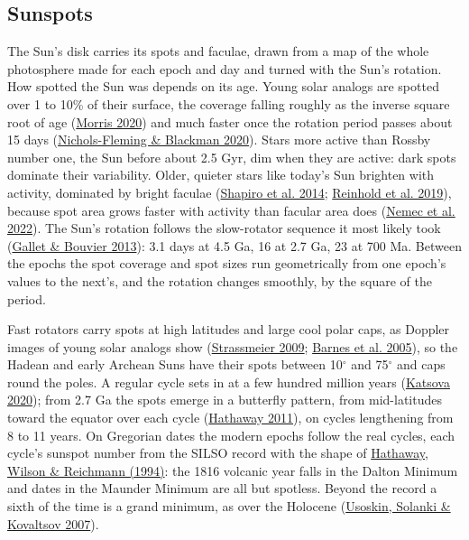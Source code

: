 \documentclass[9pt,twocolumn]{extarticle}
\begin{document}
\subsection{Sunspots}\label{sunspots}

The Sun's disk carries its spots and faculae, drawn from a map of the whole photosphere made for each epoch and day and turned with the Sun's rotation. How spotted the Sun was depends on its age. Young solar analogs are spotted over 1 to 10\% of their surface, the coverage falling roughly as the inverse square root of age (\protect\hyperlink{cite.morris2020}{Morris 2020}) and much faster once the rotation period passes about 15 days (\protect\hyperlink{cite.nicholsfleming2020}{Nichols-Fleming \& Blackman 2020}). Stars more active than Rossby number one, the Sun before about 2.5 Gyr, dim when they are active: dark spots dominate their variability. Older, quieter stars like today's Sun brighten with activity, dominated by bright faculae (\protect\hyperlink{cite.shapiro2014}{Shapiro et al. 2014}; \protect\hyperlink{cite.reinhold2019}{Reinhold et al. 2019}), because spot area grows faster with activity than facular area does (\protect\hyperlink{cite.nemec2022}{Nemec et al. 2022}). The Sun's rotation follows the slow-rotator sequence it most likely took (\protect\hyperlink{cite.gallet2013}{Gallet \& Bouvier 2013}): 3.1 days at 4.5 Ga, 16 at 2.7 Ga, 23 at 700 Ma. Between the epochs the spot coverage and spot sizes run geometrically from one epoch's values to the next's, and the rotation changes smoothly, by the square of the period.

Fast rotators carry spots at high latitudes and large cool polar caps, as Doppler images of young solar analogs show (\protect\hyperlink{cite.strassmeier2009}{Strassmeier 2009}; \protect\hyperlink{cite.barnes2005}{Barnes et al. 2005}), so the Hadean and early Archean Suns have their spots between 10$^\circ$ and 75$^\circ$ and caps round the poles. A regular cycle sets in at a few hundred million years (\protect\hyperlink{cite.katsova2020}{Katsova 2020}); from 2.7 Ga the spots emerge in a butterfly pattern, from mid-latitudes toward the equator over each cycle (\protect\hyperlink{cite.hathaway2011}{Hathaway 2011}), on cycles lengthening from 8 to 11 years. On Gregorian dates the modern epochs follow the real cycles, each cycle's sunspot number from the SILSO record with the shape of \protect\hyperlink{cite.hathaway1994}{Hathaway, Wilson \& Reichmann (1994)}: the 1816 volcanic year falls in the Dalton Minimum and dates in the Maunder Minimum are all but spotless. Beyond the record a sixth of the time is a grand minimum, as over the Holocene (\protect\hyperlink{cite.usoskin2007}{Usoskin, Solanki \& Kovaltsov 2007}).
\end{document}
